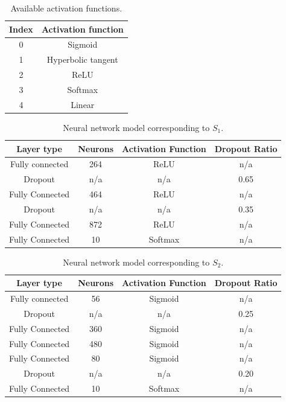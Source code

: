 \documentclass[12pt]{elsart}%
\begin{document}
\begin{table}[!htb]
\begin{center}
\caption{Available activation functions.}
\label{table:index_to_activation_functions}
\vspace{12pt}
\begin{tabular}{| c | c |}
\hline
Index & Activation function \\
\hline
0 & Sigmoid \\
1 & Hyperbolic tangent \\
2 & ReLU \\
3 & Softmax \\
4 & Linear \\
\hline
\end{tabular}
\end{center}
\end{table}

\begin{table}[!htb]
\begin{center}
\caption{Neural network model corresponding to $S_1$.}
\label{table:neural_network_model_S1}
\vspace{12pt}
\begin{tabular}{| c | c | c | c |}
\hline
Layer type & Neurons & Activation Function & Dropout Ratio \\
\hline
Fully connected & 264 & ReLU & n/a \\
Dropout & n/a & n/a & 0.65 \\
Fully Connected & 464 & ReLU & n/a\\
Dropout & n/a & n/a & 0.35\\
Fully Connected & 872 & ReLU & n/a\\
Fully Connected & 10 & Softmax & n/a\\
\hline
\end{tabular}
\end{center}

\end{table}

\begin{table}[!htb]
\begin{center}
\caption{Neural network model corresponding to $S_2$.}
\label{table:neural_network_model_S2}
\vspace{12pt}
\begin{tabular}{| c | c | c | c |}
\hline
Layer type & Neurons & Activation Function & Dropout Ratio \\
\hline
Fully connected & 56 & Sigmoid & n/a \\
Dropout & n/a & n/a & 0.25 \\
Fully Connected & 360 & Sigmoid & n/a\\
Fully Connected & 480 & Sigmoid & n/a\\
Fully Connected & 80 & Sigmoid & n/a\\
Dropout & n/a & n/a & 0.20\\
Fully Connected & 10 & Softmax & n/a\\
\hline
\end{tabular}
\end{center}

\end{table}
\end{document}
